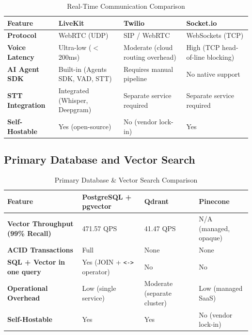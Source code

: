 \begin{table}[H]
    \caption{Real-Time Communication Comparison}
    \centering
    \renewcommand{\arraystretch}{1.3}
    \begin{tabular}{|p{}|p{}|p{}|p{}|}
        \hline
        \textbf{Feature} & \textbf{LiveKit} & \textbf{Twilio} & \textbf{Socket.io} \\
        \hline
        \textbf{Protocol} & WebRTC (UDP) & SIP / WebRTC & WebSockets (TCP) \\
        \textbf{Voice Latency} & Ultra-low ($<$200ms) \cite{versatik2025webrtc} & Moderate (cloud routing overhead) & High (TCP head-of-line blocking) \\
        \textbf{AI Agent SDK} & Built-in (Agents SDK, VAD, STT) & Requires manual pipeline & No native support \\
        \textbf{STT Integration} & Integrated (Whisper, Deepgram) & Separate service required & Separate service required \\
        \textbf{Self-Hostable} & Yes (open-source) & No (vendor lock-in) & Yes \\
        \hline
    \end{tabular}
\end{table}

\subsection{Primary Database and Vector Search}

\begin{table}[H]
    \caption{Primary Database \& Vector Search Comparison}
    \centering
    \renewcommand{\arraystretch}{1.3}
    \begin{tabular}{|p{}|p{}|p{}|p{}|}
        \hline
        \textbf{Feature} & \textbf{PostgreSQL + pgvector} & \textbf{Qdrant} & \textbf{Pinecone} \\
        \hline
        \textbf{Vector Throughput (99\% Recall)} & 471.57 QPS \cite{tigerdata2025pgvector} & 41.47 QPS \cite{tigerdata2025pgvector} & N/A (managed, opaque) \\
        \textbf{ACID Transactions} & Full \cite{postgresql2024acid} & None & None \\
        \textbf{SQL + Vector in one query} & Yes (JOIN + \texttt{<->} operator) & No & No \\
        \textbf{Operational Overhead} & Low (single service) & Moderate (separate cluster) & Low (managed SaaS) \\
        \textbf{Self-Hostable} & Yes & Yes & No (vendor lock-in) \\
        \hline
    \end{tabular}
\end{table}

